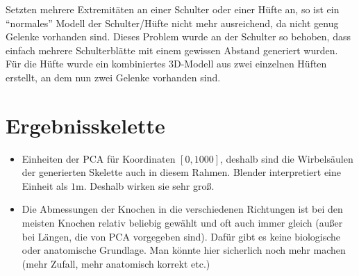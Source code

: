 Setzten mehrere Extremitäten an einer Schulter oder einer Hüfte an, so ist ein "`normales"' Modell der Schulter/Hüfte nicht mehr ausreichend, da nicht genug Gelenke vorhanden sind. Dieses Problem wurde an der Schulter so behoben, dass einfach mehrere Schulterblätte mit einem gewissen Abstand generiert wurden. Für die Hüfte wurde ein kombiniertes 3D-Modell aus zwei einzelnen Hüften erstellt, an dem nun zwei Gelenke vorhanden sind.

\section{Ergebnisskelette}

\begin{itemize}
 \item Einheiten der PCA für Koordinaten $[0, 1000]$, deshalb sind die Wirbelsäulen der generierten Skelette auch in diesem Rahmen. Blender interpretiert eine Einheit als $1$m. Deshalb wirken sie sehr groß.
 
 \item Die Abmessungen der Knochen in die verschiedenen Richtungen ist bei den meisten Knochen relativ beliebig gewählt und oft auch immer gleich (außer bei Längen, die von PCA vorgegeben sind). Dafür gibt es keine biologische oder anatomische Grundlage. Man könnte hier sicherlich noch mehr machen (mehr Zufall, mehr anatomisch korrekt etc.)
\end{itemize}


